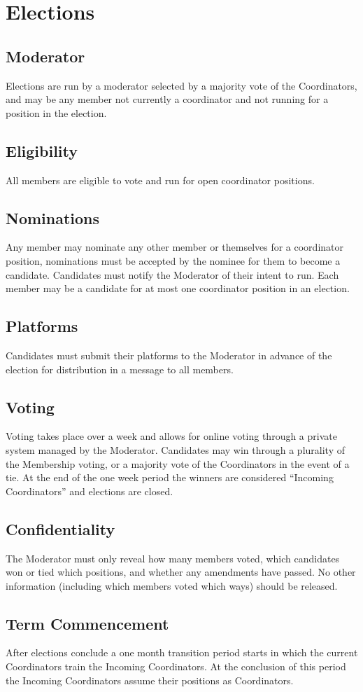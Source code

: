 \chapter{Elections}\label{sec:elections}

\section{Moderator}\label{sec:moderator}
Elections are run by a moderator selected by a majority vote of the Coordinators, and may be any member not currently a coordinator and not running for a position in the election.

\section{Eligibility}\label{sec:eligibility}
All members are eligible to vote and run for open coordinator positions.

\section{Nominations}\label{sec:nominations}
Any member may nominate any other member or themselves for a coordinator position, nominations must be accepted by the nominee for them to become a candidate. Candidates must notify the Moderator of their intent to run. Each member may be a candidate for at most one coordinator position in an election.

\section{Platforms}\label{sec:platforms}
Candidates must submit their platforms to the Moderator in advance of the election for distribution in a message to all members.

\section{Voting}\label{sec:voting}
Voting takes place over a week and allows for online voting through a private system managed by the Moderator. Candidates may win through a plurality of the Membership voting, or a majority vote of the Coordinators in the event of a tie. At the end of the one week period the winners are considered ``Incoming Coordinators'' and elections are closed.

\section{Confidentiality}\label{sec:confidentiality}
The Moderator must only reveal how many members voted, which candidates won or tied which positions, and whether any amendments have passed. No other information (including which members voted which ways) should be released.

\section{Term Commencement}\label{sec:term_commencement}
After elections conclude a one month transition period starts in which the current Coordinators train the Incoming Coordinators. At the conclusion of this period the Incoming Coordinators assume their positions as Coordinators.
